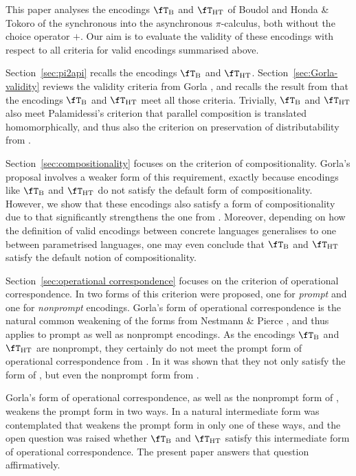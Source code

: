 \documentclass[runningheads]{llncs}
\newcommand{\sect}[1]{Section~\ref{sec:#1}}
\newcommand{\fTHT}{\fT_{\textrm{HT}}}       %
\begin{document}
This paper analyses the encodings $\fT_{\rm B}$ and $\fTHT$ of Boudol and Honda \&
Tokoro of the synchronous into the asynchronous $\pi$-calculus, both without the choice operator $+$.
Our aim is to evaluate the validity of these encodings with respect to all criteria for valid
encodings summarised above.

\sect{pi2api} recalls the encodings $\fT_{\rm B}$ and $\fT_{\rm HT}$.
\sect{Gorla-validity} reviews the validity criteria from Gorla \cite{Gorla10a}, and recalls the result
from \cite{vG18a} that the encodings $\fT_{\rm B}$ and $\fT_{\rm HT}$ meet all those criteria.
Trivially, $\fT_{\rm B}$ and $\fT_{\rm HT}$ also meet Palamidessi's criterion that
parallel composition is translated homomorphically, and thus also the criterion on preservation of
distributability from \cite{PNG13}.

\sect{compositionality} focuses on the criterion of compositionality. Gorla's proposal involves a weaker form of
this requirement, exactly because encodings like $\fT_{\rm B}$ and $\fTHT$ do not satisfy
the default form of compositionality. However, we show that these encodings also satisfy a form of
compositionality due to \cite{vG12} that significantly strengthens the one from \cite{Gorla10a}.
Moreover, depending on how the definition of valid encodings between concrete languages generalises
to one between parametrised languages, one may even conclude that $\fT_{\rm B}$ and $\fT_{\rm HT}$
satisfy the default notion of compositionality.

\sect{operational correspondence} focuses on the criterion of operational correspondence.
In \cite{NestmannP00} two forms of this criterion were proposed, one for \emph{prompt} and one for
\emph{nonprompt} encodings. Gorla's form of operational correspondence \cite{Gorla10a} is the natural common weakening
of the forms from Nestmann \& Pierce \cite{NestmannP00}, and thus applies to prompt as well as
nonprompt encodings. As the encodings $\fT_{\rm B}$ and $\fT_{\rm HT}$ are nonprompt, they certainly
do not meet the prompt form of operational correspondence from \cite{NestmannP00}. In \cite{vG18a}
it was shown that they not only satisfy the form of \cite{Gorla10a}, but even the nonprompt form
from \cite{NestmannP00}.

Gorla's form of operational correspondence, as well as the nonprompt form of \cite{NestmannP00},
weakens the prompt form in two ways. In \cite{vG18a} a natural intermediate form was contemplated
that weakens the prompt form in only one of these ways, and the open question was raised whether 
$\fT_{\rm B}$ and $\fT_{\rm HT}$ satisfy this intermediate form of operational correspondence.
The present paper answers that question affirmatively.
\end{document}
